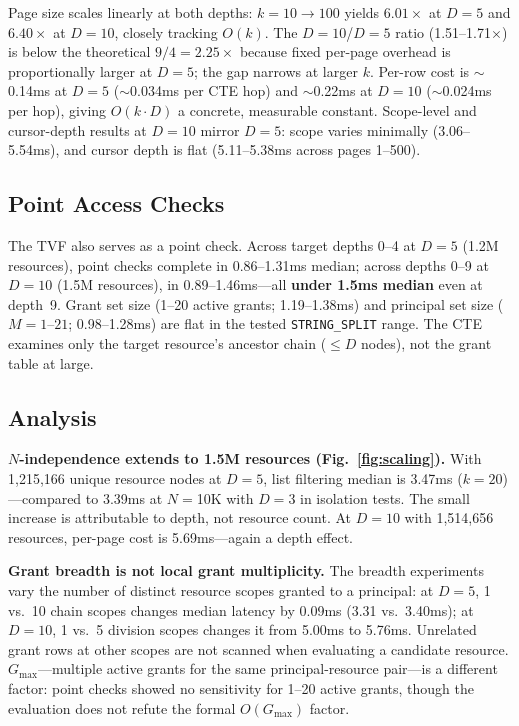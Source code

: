 \documentclass[conference]{IEEEtran}
\begin{document}
Page size scales linearly at both depths: $k{=}10 \to 100$ yields $6.01\times$ at $D{=}5$ and $6.40\times$ at $D{=}10$, closely tracking $O(k)$. The $D{=}10$/$D{=}5$ ratio (1.51--1.71$\times$) is below the theoretical $9/4 = 2.25\times$ because fixed per-page overhead is proportionally larger at $D{=}5$; the gap narrows at larger $k$. Per-row cost is ${\sim}$0.14ms at $D{=}5$ (${\sim}$0.034ms per CTE hop) and ${\sim}$0.22ms at $D{=}10$ (${\sim}$0.024ms per hop), giving $O(k \cdot D)$ a concrete, measurable constant. Scope-level and cursor-depth results at $D{=}10$ mirror $D{=}5$: scope varies minimally (3.06--5.54ms), and cursor depth is flat (5.11--5.38ms across pages 1--500).

\subsection{Point Access Checks}

The TVF also serves as a point check. Across target depths 0--4 at $D{=}5$ (1.2M resources), point checks complete in 0.86--1.31ms median; across depths 0--9 at $D{=}10$ (1.5M resources), in 0.89--1.46ms---all \textbf{under 1.5ms median} even at depth~9. Grant set size (1--20 active grants; 1.19--1.38ms) and principal set size ($M{=}1$--$21$; 0.98--1.28ms) are flat in the tested \texttt{STRING\_SPLIT} range. The CTE examines only the target resource's ancestor chain (${\leq}D$ nodes), not the grant table at large.

\subsection{Analysis}

\textbf{$N$-independence extends to 1.5M resources (Fig.~\ref{fig:scaling}).} With 1,215,166 unique resource nodes at $D{=}5$, list filtering median is 3.47ms ($k{=}20$)---compared to 3.39ms at $N{=}$10K with $D{=}3$ in isolation tests. The small increase is attributable to depth, not resource count. At $D{=}10$ with 1,514,656 resources, per-page cost is 5.69ms---again a depth effect.

\textbf{Grant breadth is not local grant multiplicity.} The breadth experiments vary the number of distinct resource scopes granted to a principal: at $D{=}5$, 1 vs.\ 10 chain scopes changes median latency by 0.09ms (3.31 vs.\ 3.40ms); at $D{=}10$, 1 vs.\ 5 division scopes changes it from 5.00ms to 5.76ms. Unrelated grant rows at other scopes are not scanned when evaluating a candidate resource. $G_{\max}$---multiple active grants for the same principal-resource pair---is a different factor: point checks showed no sensitivity for 1--20 active grants, though the evaluation does not refute the formal $O(G_{\max})$ factor.
\end{document}
